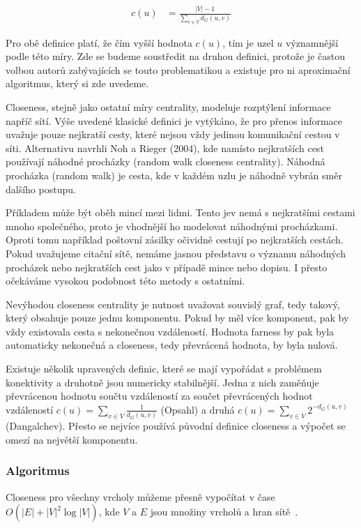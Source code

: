 \documentclass{bakalarka}
\begin{document}
\begin{align*}
c(u) &= \frac{|V| - 1}{\sum_{v \in V} d_G(u, v)}
\end{align*}

Pro obě definice platí, že čím vyšší hodnota $c(u)$, tím je uzel $u$
významnější podle této míry. Zde se budeme soustředit na druhou definici,
protože je častou volbou autorů zabývajících se touto problematikou a existuje
pro ni aproximační algoritmus, který si zde uvedeme.

Closeness, stejně jako ostatní míry centrality, modeluje rozptýlení informace
napříč sítí. Výše uvedené klasické definici je vytýkáno, že pro přenos
informace uvažuje pouze nejkratší cesty, které nejsou vždy jedinou komunikační
cestou v síti. Alternativu navrhli Noh a Rieger (2004), kde namísto nejkratších
cest používají náhodné procházky (random walk closeness centrality). Náhodná
procházka (random walk) je cesta, kde v každém uzlu je náhodně vybrán směr
dalšího postupu.

Příkladem může být oběh mincí mezi lidmi. Tento jev nemá s nejkratšími cestami
mnoho společného, proto je vhodnější ho modelovat náhodnými procházkami. Oproti
tomu například poštovní zásilky očividně cestují po nejkratších cestách. Pokud
uvažujeme citační sítě, nemáme jasnou představu o významu náhodných procházek
nebo nejkratších cest jako v případě mince nebo dopisu. I přesto očekáváme
vysokou podobnost této metody s ostatními.

Nevýhodou closeness centrality je nutnost uvažovat souvislý graf, tedy takový,
který obsahuje pouze jednu komponentu. Pokud by měl více komponent, pak by vždy
existovala cesta s nekonečnou vzdáleností. Hodnota farness by pak byla
automaticky nekonečná a closeness, tedy převrácená hodnota, by byla nulová. 

Existuje několik upravených definic, které se mají vypořádat s problémem
konektivity a druhotně jsou numericky stabilnější. Jedna z nich zaměňuje
převrácenou hodnotu součtu vzdáleností za součet převrácených hodnot
vzdáleností $c(u) = \sum_{v \in V} \frac{1}{d_G(u, v)}$ (Opsahl) a druhá $c(u)
= \sum_{v \in V} 2^{-d_G(u, v)}$ (Dangalchev). Přesto se nejvíce používá
původní definice closeness a výpočet se omezí na největší komponentu.


\subsubsection{Algoritmus}
Closeness pro všechny vrcholy můžeme přesně vypočítat v čase $O(|E| +
|V|^2\log|V|)$, kde $V$ a $E$ jsou množiny vrcholů a hran
sítě~\citep{fredmantarjan}.
\end{document}
